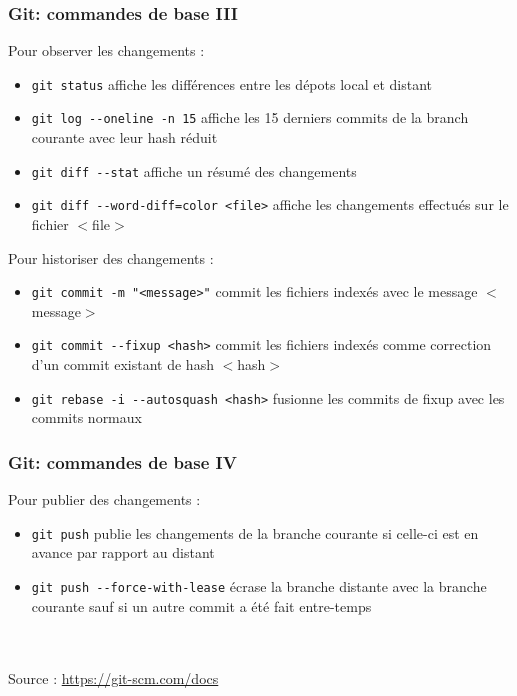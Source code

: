 \begin{frame}
	\frametitle{Git: commandes de base III}
	Pour observer les changements :
    \begin{itemize}
	  \item {\lstinline[basicstyle=\ttfamily\color{blue}]|git status|} affiche les diff\'erences entre les d\'epots local et distant
      \item {\lstinline[basicstyle=\ttfamily\color{blue}]|git log --oneline -n 15|} affiche les 15 derniers commits de la branch courante avec leur hash r\'eduit
	  \item {\lstinline[basicstyle=\ttfamily\color{blue}]|git diff --stat|} affiche un r\'esum\'e des changements
      \item {\lstinline[basicstyle=\ttfamily\color{blue}]|git diff --word-diff=color <file>|} affiche les changements effectu\'es sur le fichier $<$file$>$
    \end{itemize}
	Pour historiser des changements :
	\begin{itemize}
      \item {\lstinline[basicstyle=\ttfamily\color{blue}]|git commit -m "<message>"|} commit les fichiers index\'es avec le message $<$message$>$
      \item {\lstinline[basicstyle=\ttfamily\color{blue}]|git commit --fixup <hash>|} commit les fichiers index\'es comme correction d'un commit existant de hash $<$hash$>$
	  \item {\lstinline[basicstyle=\ttfamily\color{blue}]|git rebase -i --autosquash <hash>|} fusionne les commits de fixup avec les commits normaux
    \end{itemize}
\end{frame}

\begin{frame}
	\frametitle{Git: commandes de base IV}
	Pour publier des changements :
	\begin{itemize}
      \item {\lstinline[basicstyle=\ttfamily\color{blue}]|git push|} publie les changements de la branche courante si celle-ci est en avance par rapport au distant
      \item {\lstinline[basicstyle=\ttfamily\color{blue}]|git push --force-with-lease|} \'ecrase la branche distante avec la branche courante sauf si un autre commit a \'et\'e fait entre-temps
    \end{itemize}
	
	~\\~\\

	Source : \url{https://git-scm.com/docs}
\end{frame}


